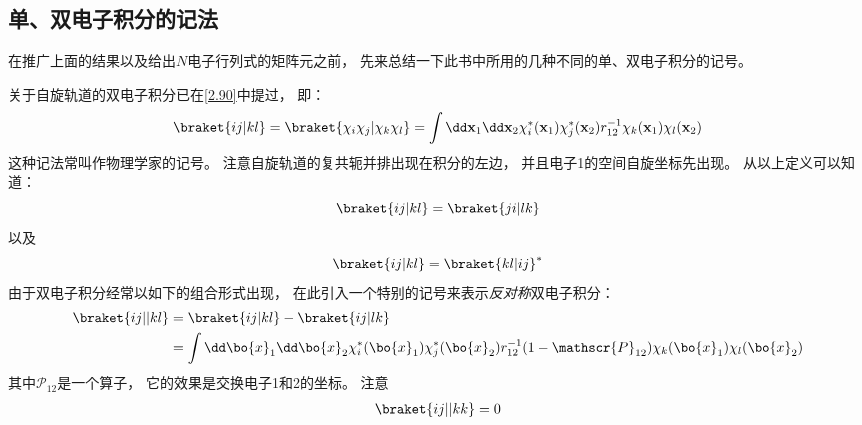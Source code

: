 
\subsection{单、双电子积分的记法}
\label{sec2.3.2}
在推广上面的结果以及给出$N$电子行列式的矩阵元之前，
先来总结一下此书中所用的几种不同的单、双电子积分的记号。

关于自旋轨道的双电子积分已在\autoref{2.90}中提过，
即：
\begin{equation}
\braket{ij|kl}=\braket{\chi_i\chi_j|\chi_k\chi_l}=\int\dd\mathbf{x}_1\dd\mathbf{x}_2\chi_i^*(\mathbf{x}_1)\chi_j^*(\mathbf{x}_2)r_{12}^{-1}\chi_k(\mathbf{x}_1)\chi_l(\mathbf{x}_2)
\end{equation}
这种记法常叫作物理学家的记号。
注意自旋轨道的复共轭并排出现在积分的左边，
并且电子1的空间自旋坐标先出现。
从以上定义可以知道：
\begin{equation}
\braket{ij|kl}=\braket{ji|lk}
\end{equation}
以及
\begin{equation}
\braket{ij|kl}=\braket{kl|ij}^*
\end{equation}
由于双电子积分经常以如下的组合形式出现，
在此引入一个特别的记号来表示\emph{反对称}双电子积分：
\begin{align}
\braket{ij||kl}&=\braket{ij|kl} - \braket{ij|lk}\notag\\
&=\int\dd\bo{x}_1\dd\bo{x}_2\chi_i^*(\bo{x}_1)\chi_j^*(\bo{x}_2)r_{12}^{-1}(1-\mathscr{P}_{12})\chi_k(\bo{x}_1)\chi_l(\bo{x}_2)
\end{align}
其中$\mathscr{P}_{12}$是一个算子，
它的效果是交换电子1和2的坐标。
注意
\begin{align}
\braket{ij||kk}=0
\label{2.97}
\end{align}

